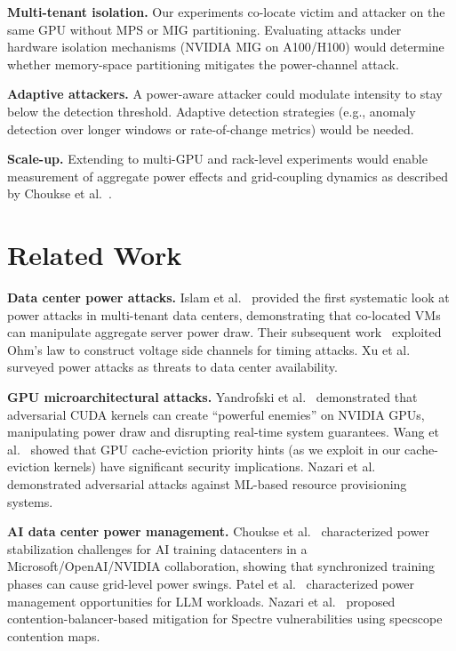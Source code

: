 \documentclass[conference]{IEEEtran}
\begin{document}
\textbf{Multi-tenant isolation.}  Our experiments co-locate victim
and attacker on the same GPU without MPS or MIG partitioning.
Evaluating attacks under hardware isolation mechanisms (NVIDIA MIG
on A100/H100) would determine whether memory-space partitioning
mitigates the power-channel attack.

\textbf{Adaptive attackers.}  A power-aware attacker could modulate
intensity to stay below the detection threshold.  Adaptive detection
strategies (e.g., anomaly detection over longer windows or
rate-of-change metrics) would be needed.

\textbf{Scale-up.}  Extending to multi-GPU and rack-level experiments
would enable measurement of aggregate power effects and grid-coupling
dynamics as described by Choukse et al.~\cite{choukse2025}.

\section{Related Work}
\label{sec:related}

\textbf{Data center power attacks.}
Islam et al.~\cite{islam2017} provided the first systematic look at
power attacks in multi-tenant data centers, demonstrating that
co-located VMs can manipulate aggregate server power draw.  Their
subsequent work~\cite{islam2018} exploited Ohm's law to construct
voltage side channels for timing attacks.  Xu et al.~\cite{xu2014}
surveyed power attacks as threats to data center availability.

\textbf{GPU microarchitectural attacks.}
Yandrofski et al.~\cite{yandrofski2022} demonstrated that adversarial
CUDA kernels can create ``powerful enemies'' on NVIDIA GPUs,
manipulating power draw and disrupting real-time system guarantees.
Wang et al.~\cite{wang2025} showed that GPU cache-eviction priority
hints (as we exploit in our cache-eviction kernels) have significant
security implications.  Nazari et al.~\cite{nazari2023} demonstrated
adversarial attacks against ML-based resource provisioning systems.

\textbf{AI data center power management.}
Choukse et al.~\cite{choukse2025} characterized power stabilization
challenges for AI training datacenters in a Microsoft/OpenAI/NVIDIA
collaboration, showing that synchronized training phases can cause
grid-level power swings.  Patel et al.~\cite{patel2024}
characterized power management opportunities for LLM workloads.
Nazari et al.~\cite{nazari2026} proposed contention-balancer-based
mitigation for Spectre vulnerabilities using specscope contention
maps.
\end{document}
